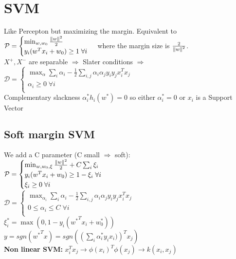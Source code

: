 \section{SVM} 
Like Percepton but maximizing the margin. Equivalent to\\
\(\mathcal{P} =
\begin{cases}
	\min_{w,w_0} \frac{\left\lVert w\right\rVert^2}{2}\\
	y_i(w^Tx_i +  w_0)\geq 1 \;\forall i\\
\end{cases}
\)
where the margin size is \(\frac{2}{\left\lVert w\right\rVert^2}\).\\
$X^+, X^-$ are separable $\Rightarrow$ Slater conditions $\Rightarrow$ \\
\(\mathcal{D} =
	\begin{cases}
		\max_{\alpha} \sum_i \alpha_i - \frac{1}{2}\sum_{i,j}\alpha_i\alpha_jy_iy_jx_i^Tx_j\\
		\alpha_i\geq 0 \;\forall i\\
	\end{cases}
		\)\\
Complementary slackness \(\alpha_i^*h_i(w^*)=0\) so either \(\alpha^*_i = 0\)  or \(x_i\) is a Support Vector
\subsection*{Soft margin SVM}
We add a C parameter (C small \(\Rightarrow\) soft):\\
\(\mathcal{P} =
\begin{cases}
	\min_{w,w_0, \xi} \frac{\left\lVert w\right\rVert^2}{2} + C\sum_i\xi_i\\
	y_i(w^Tx_i +  w_0)\geq 1 -\xi_i\;\forall i\\
	\xi_i\geq 0\;\forall i\\
\end{cases}
\)\\
\(\mathcal{D} =
\begin{cases}
	\max_{\alpha_i}\sum_i \alpha_i - \frac{1}{2}\sum_{i,j}\alpha_i\alpha_jy_iy_jx_i^Tx_j\\
	0\leq \alpha_i\leq C \;\forall i\\
\end{cases}
\)\\
\(\xi_i^{*} = \max(0,1-y_i({w^*}^Tx_i + w_0^*))\)\\
$y = sgn\left({w^*}^Tx\right) = sgn\left(\left(\sum_i\alpha_i^*y_ix_i)\right)^Tx_j \right)$\\
\textbf{Non linear SVM: }$x_i^Tx_j \rightarrow \phi(x_i)^T\phi(x_j) \rightarrow k(x_i,x_j)$%
